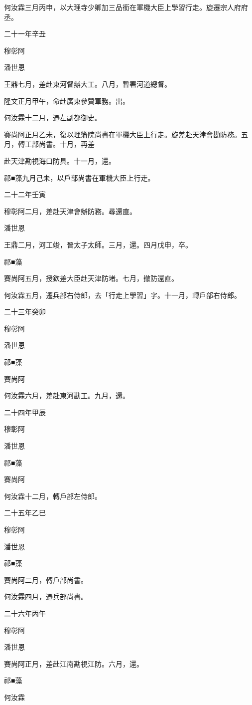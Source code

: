 \begin{pinyinscope}
何汝霖三月丙申，以大理寺少卿加三品銜在軍機大臣上學習行走。旋遷宗人府府丞。

二十一年辛丑

穆彰阿

潘世恩

王鼎七月，差赴東河督辦大工。八月，暫署河道總督。

隆文正月甲午，命赴廣東參贊軍務。出。

何汝霖十二月，遷左副都御史。

賽尚阿正月乙未，復以理籓院尚書在軍機大臣上行走。旋差赴天津會勘防務。五月，轉工部尚書。十月，再差

赴天津勘視海口防具。十一月，還。

祁■藻九月己未，以戶部尚書在軍機大臣上行走。

二十二年壬寅

穆彰阿二月，差赴天津會辦防務。尋還直。

潘世恩

王鼎二月，河工竣，晉太子太師。三月，還。四月戊申，卒。

祁■藻

賽尚阿五月，授欽差大臣赴天津防堵。七月，撤防還直。

何汝霖五月，遷兵部右侍郎，去「行走上學習」字。十一月，轉戶部右侍郎。

二十三年癸卯

穆彰阿

潘世恩

祁■藻

賽尚阿

何汝霖六月，差赴東河勘工。九月，還。

二十四年甲辰

穆彰阿

潘世恩

祁■藻

賽尚阿

何汝霖十二月，轉戶部左侍郎。

二十五年乙巳

穆彰阿

潘世恩

祁■藻

賽尚阿二月，轉戶部尚書。

何汝霖四月，遷兵部尚書。

二十六年丙午

穆彰阿

潘世恩

賽尚阿正月，差赴江南勘視江防。六月，還。

祁■藻

何汝霖


\end{pinyinscope}
